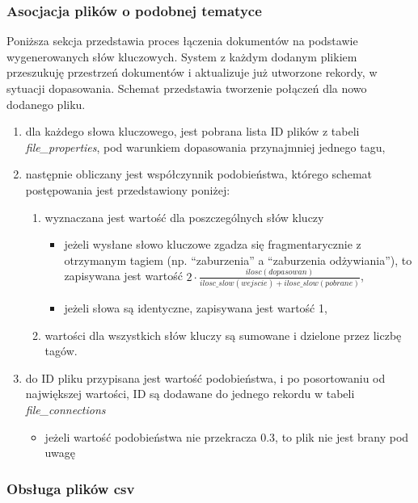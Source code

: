 \documentclass[12pt,a4paper,twoside]{article}
\begin{document}
\subsubsection{Asocjacja plików o podobnej tematyce}
Poniższa sekcja przedstawia proces łączenia dokumentów na podstawie wygenerowanych słów kluczowych. System z każdym dodanym plikiem przeszukuję przestrzeń dokumentów i aktualizuje już utworzone rekordy, w sytuacji dopasowania. Schemat przedstawia tworzenie połączeń dla nowo dodanego pliku.
\begin{enumerate}
\item dla każdego słowa kluczowego, jest pobrana lista ID plików z tabeli \textit{file\_properties}, pod warunkiem dopasowania przynajmniej jednego tagu,
\item następnie obliczany jest współczynnik podobieństwa, którego schemat postępowania jest przedstawiony poniżej:
	\begin{enumerate}
		\item wyznaczana jest wartość dla poszczególnych słów kluczy
		\begin{itemize}
			\item jeżeli wysłane słowo kluczowe zgadza się fragmentarycznie z otrzymanym tagiem (np. ``zaburzenia'' a ``zaburzenia odżywiania''), to zapisywana jest wartość $2\cdot\frac{ilosc(dopasowan)}{ilosc\_slow(wejscie)+ilosc\_slow(pobrane)}$,
			\item jeżeli słowa są identyczne, zapisywana jest wartość 1,
		\end{itemize}
		\item wartości dla wszystkich słów kluczy są sumowane i dzielone przez liczbę tagów.
	\end{enumerate}
\item do ID pliku przypisana jest wartość podobieństwa, i po posortowaniu od największej wartości, ID są dodawane do jednego rekordu w tabeli \textit{file\_connections}
	\begin{itemize}
		\item jeżeli wartość podobieństwa nie przekracza 0.3, to plik nie jest brany pod uwagę
	\end{itemize}
\end{enumerate}
\subsubsection{Obsługa plików csv}
\end{document}
